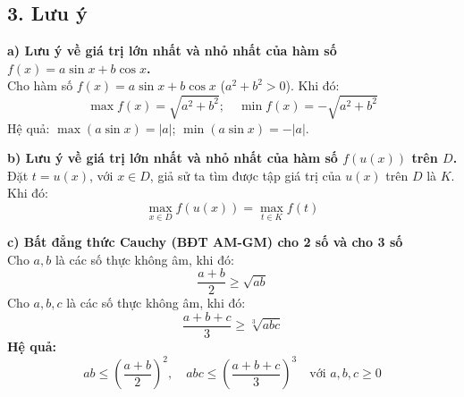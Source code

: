 \documentclass[12pt,a4paper]{extarticle}
\begin{document}
\subsection*{3. Lưu ý}

\noindent \textbf{\color{blue}a) Lưu ý về giá trị lớn nhất và nhỏ nhất của hàm số $f(x) = a\sin x + b\cos x$.}\\
Cho hàm số $f(x) = a\sin x + b\cos x$ ($a^2 + b^2 > 0$). Khi đó:
\[
\max f(x) = \sqrt{a^2 + b^2}; \quad \min f(x) = -\sqrt{a^2 + b^2}
\]
Hệ quả: $\max(a\sin x) = |a|$; \quad $\min(a\sin x) = -|a|$.

\vspace{0.4cm}

\noindent \textbf{\color{blue}b) Lưu ý về giá trị lớn nhất và nhỏ nhất của hàm số $f(u(x))$ trên $D$.}\\
Đặt $t = u(x)$, với $x \in D$, giả sử ta tìm được tập giá trị của $u(x)$ trên $D$ là $K$. Khi đó:
\[
\max_{x \in D} f(u(x)) = \max_{t \in K} f(t)
\]

\vspace{0.4cm}

\noindent \textbf{\color{blue}c) Bất đẳng thức Cauchy (BĐT AM-GM) cho 2 số và cho 3 số}\\
Cho $a, b$ là các số thực không âm, khi đó:
\[
\frac{a + b}{2} \ge \sqrt{ab}
\]
Cho $a, b, c$ là các số thực không âm, khi đó:
\[
\frac{a + b + c}{3} \ge \sqrt[3]{abc}
\]
\noindent \textbf{Hệ quả:}
\[
ab \le \left(\frac{a + b}{2}\right)^2, \quad abc \le \left(\frac{a + b + c}{3}\right)^3 \quad \text{với } a, b, c \ge 0
\]
\end{document}
